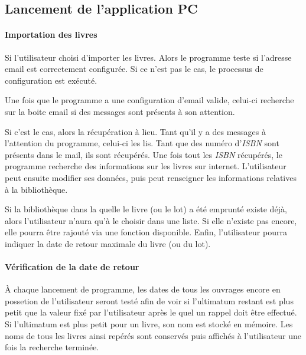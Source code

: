 \subsection{Lancement de l'application PC}

\paragraph{Importation des livres}
Si l'utilisateur choisi d'importer les livres. Alors le programme teste si l'adresse email est correctement configurée. Si ce n'est pas le cas, le processus de configuration est exécuté. 

Une fois que le programme a une configuration d'email valide, celui-ci recherche sur la boite email si des messages sont présents à son attention. 

Si c'est le cas, alors la récupération à lieu. 
Tant qu'il y a des messages à l'attention du programme, celui-ci les lis. 
Tant que des numéro d'\emph{ISBN} sont présents dans le mail, ils sont récupérés. 
Une fois tout les \emph{ISBN} récupérés, le programme recherche des informations sur les livres sur internet.
L'utilisateur peut ensuite modifier ses données, puis peut renseigner les informations relatives à la bibliothèque. 

Si la bibliothèque dans la quelle le livre (ou le lot) a été emprunté existe déjà, 
alors l'utilisateur n'aura qu'à le choisir dans une liste. Si elle n'existe pas encore, elle pourra être rajouté via une fonction disponible. 
Enfin, l'utilisateur pourra indiquer la date de retour maximale du livre (ou du lot).

\paragraph{Vérification de la date de retour}
À chaque lancement de programme, les dates de tous les ouvrages encore en possetion de l'utilisateur seront testé afin de voir si l'ultimatum restant est plus petit que la valeur fixé par l'utilisateur après le quel un rappel doit être effectué. 
Si l'ultimatum est plus petit pour un livre, son nom est stocké en mémoire. 
Les noms de tous les livres ainsi repérés sont conservés puis affichés à l'utilisateur une fois la recherche terminée. 

